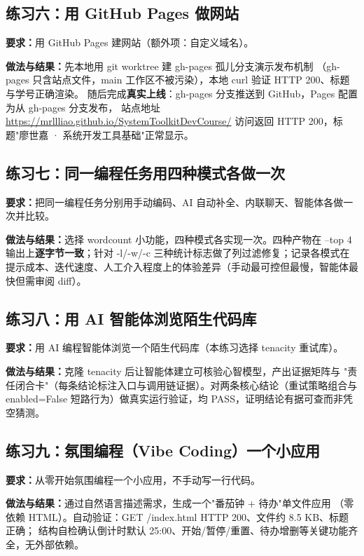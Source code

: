 \documentclass[UTF8]{ctexart}
\begin{document}
\subsection{练习六：用 GitHub Pages 做网站}

\noindent\textbf{要求：}用 GitHub Pages 建网站（额外项：自定义域名）。

\noindent\textbf{做法与结果：}先本地用 git worktree 建 gh-pages 孤儿分支演示发布机制
（gh-pages 只含站点文件，main 工作区不被污染），本地 curl 验证 HTTP 200、标题与学号正确渲染。
随后完成\textbf{真实上线}：gh-pages 分支推送到 GitHub，Pages 配置为从 gh-pages 分支发布，
站点地址 \href{https://mrllliao.github.io/SystemToolkitDevCourse/}{https://mrllliao.github.io/SystemToolkitDevCourse/}
访问返回 HTTP 200，标题"廖世嘉 · 系统开发工具基础"正常显示。
\subsection{练习七：同一编程任务用四种模式各做一次}

\noindent\textbf{要求：}把同一编程任务分别用手动编码、AI 自动补全、内联聊天、智能体各做一次并比较。

\noindent\textbf{做法与结果：}选择 wordcount 小功能，四种模式各实现一次。四种产物在 --top 4
输出上\textbf{逐字节一致}；针对 -l/-w/-c 三种统计标志做了列过滤修复；记录各模式在
提示成本、迭代速度、人工介入程度上的体验差异（手动最可控但最慢，智能体最快但需审阅 diff）。

\subsection{练习八：用 AI 智能体浏览陌生代码库}

\noindent\textbf{要求：}用 AI 编程智能体浏览一个陌生代码库（本练习选择 tenacity 重试库）。

\noindent\textbf{做法与结果：}克隆 tenacity 后让智能体建立可核验心智模型，产出证据矩阵与
"责任闭合卡"（每条结论标注入口与调用链证据）。对两条核心结论（重试策略组合与
enabled=False 短路行为）做真实运行验证，均 PASS，证明结论有据可查而非凭空猜测。

\subsection{练习九：氛围编程（Vibe Coding）一个小应用}

\noindent\textbf{要求：}从零开始氛围编程一个小应用，不手动写一行代码。

\noindent\textbf{做法与结果：}通过自然语言描述需求，生成一个"番茄钟 + 待办"单文件应用
（零依赖 HTML）。自动验证：GET /index.html HTTP 200、文件约 8.5 KB、标题正确；
结构自检确认倒计时默认 25:00、开始/暂停/重置、待办增删等关键功能齐全，无外部依赖。
\end{document}
